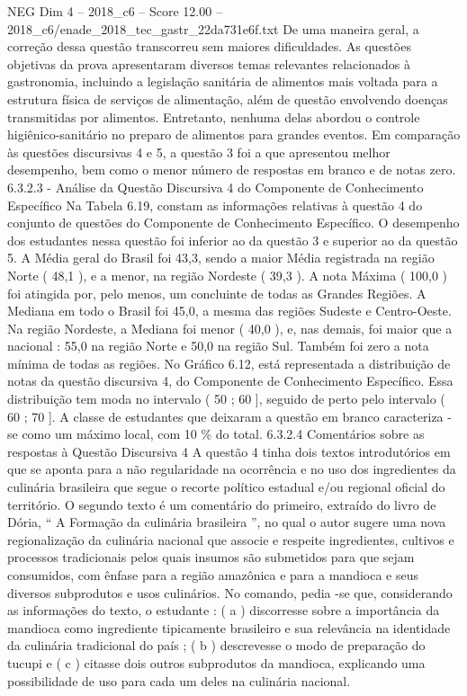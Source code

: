 \begin{textsample}{NEG Dim 4 – 2018\_c6 – Score 12.00 – 2018\_c6/enade\_2018\_tec\_gastr\_22da731e6f.txt}
De uma maneira geral, a correção dessa questão transcorreu sem maiores dificuldades.
As questões objetivas da prova apresentaram diversos temas relevantes relacionados à gastronomia, incluindo a legislação sanitária de alimentos mais voltada para a estrutura física de serviços de alimentação, além de questão envolvendo doenças transmitidas por alimentos.
Entretanto, nenhuma delas abordou o controle higiênico-sanitário no preparo de alimentos para grandes eventos.
Em comparação às questões discursivas 4 e 5, a questão 3 foi a que apresentou melhor desempenho, bem como o menor número de respostas em branco e de notas zero. 6.3.2.3 - Análise da Questão Discursiva 4 do Componente de Conhecimento Específico Na Tabela 6.19, constam as informações relativas à questão 4 do conjunto de questões do Componente de Conhecimento Específico.
O desempenho dos estudantes nessa questão foi inferior ao da questão 3 e superior ao da questão 5.
A Média geral do Brasil foi 43,3, sendo a maior Média registrada na região Norte ( 48,1 ), e a menor, na região Nordeste ( 39,3 ).
A nota Máxima ( 100,0 ) foi atingida por, pelo menos, um concluinte de todas as Grandes Regiões.
A Mediana em todo o Brasil foi 45,0, a mesma das regiões Sudeste e Centro-Oeste.
Na região Nordeste, a Mediana foi menor ( 40,0 ), e, nas demais, foi maior que a nacional : 55,0 na região Norte e 50,0 na região Sul.
Também foi zero a nota mínima de todas as regiões.
No Gráfico 6.12, está representada a distribuição de notas da questão discursiva 4, do Componente de Conhecimento Específico.
Essa distribuição tem moda no intervalo ( 50 ; 60 ], seguido de perto pelo intervalo ( 60 ; 70 ].
A classe de estudantes que deixaram a questão em branco caracteriza -se como um máximo local, com 10 \% do total. 6.3.2.4 Comentários sobre as respostas à Questão Discursiva 4 A questão 4 tinha dois textos introdutórios em que se aponta para a não regularidade na ocorrência e no uso dos ingredientes da culinária brasileira que segue o recorte político estadual e/ou regional oficial do território.
O segundo texto é um comentário do primeiro, extraído do livro de Dória, “ A Formação da culinária brasileira ”, no qual o autor sugere uma nova regionalização da culinária nacional que associe e respeite ingredientes, cultivos e processos tradicionais pelos quais insumos são submetidos para que sejam consumidos, com ênfase para a região amazônica e para a mandioca e seus diversos subprodutos e usos culinários.
No comando, pedia -se que, considerando as informações do texto, o estudante : ( a ) discorresse sobre a importância da mandioca como ingrediente tipicamente brasileiro e sua relevância na identidade da culinária tradicional do país ; ( b ) descrevesse o modo de preparação do tucupi e ( c ) citasse dois outros subprodutos da mandioca, explicando uma possibilidade de uso para cada um deles na culinária nacional.

\end{textsample}
